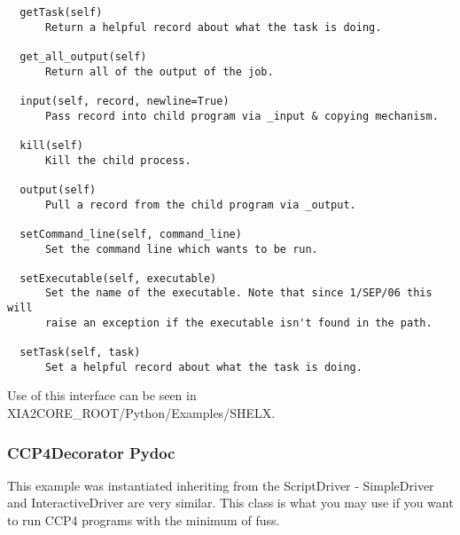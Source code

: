 \documentclass[a4paper, 11pt]{article}
\begin{document}
{\begin{verbatim}
  getTask(self)
      Return a helpful record about what the task is doing.
  
  get_all_output(self)
      Return all of the output of the job.
  
  input(self, record, newline=True)
      Pass record into child program via _input & copying mechanism.
  
  kill(self)
      Kill the child process.
  
  output(self)
      Pull a record from the child program via _output.
  
  setCommand_line(self, command_line)
      Set the command line which wants to be run.
  
  setExecutable(self, executable)
      Set the name of the executable. Note that since 1/SEP/06 this will 
      raise an exception if the executable isn't found in the path.
  
  setTask(self, task)
      Set a helpful record about what the task is doing.
\end{verbatim}
}

\noindent
Use of this interface can be seen in XIA2CORE\_ROOT/Python/Examples/SHELX.

\subsubsection{CCP4Decorator Pydoc}

This example was instantiated inheriting from the ScriptDriver - SimpleDriver
and InteractiveDriver are very similar. This class is what you may use if 
you want to run CCP4 programs with the minimum of fuss.
\end{document}
